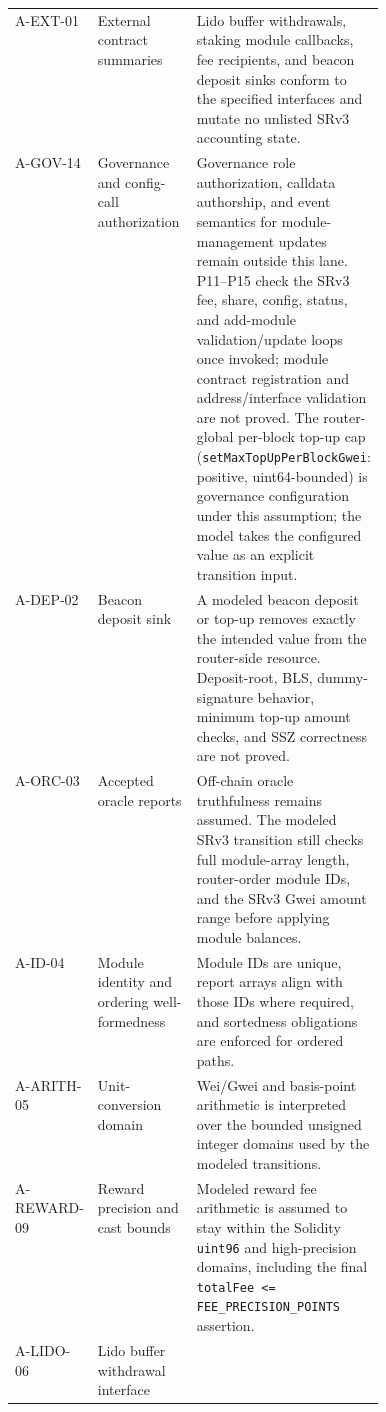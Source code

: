 \noindent
\begin{xltabular}{\linewidth}{@{}p{0.16\linewidth}p{0.27\linewidth}>{\raggedright\arraybackslash}X@{}}
  \toprule
   &  &  \\
  \midrule
  \endhead
  A-EXT-01 & External contract summaries &
  Lido buffer withdrawals, staking module callbacks, fee recipients, and beacon
  deposit sinks conform to the specified interfaces and mutate no unlisted SRv3
  accounting state. \\
  \rowsep
  A-GOV-14 & Governance and config-call authorization &
  Governance role authorization, calldata authorship, and event semantics for
  module-management updates remain outside this lane. P11--P15 check the SRv3
  fee, share, config, status, and add-module validation/update loops once invoked;
  module contract registration and address/interface validation are not proved.
  The router-global per-block top-up cap
  (\texttt{setMaxTopUpPerBlockGwei}: positive, uint64-bounded) is governance
  configuration under this assumption; the model takes the configured value as
  an explicit transition input. \\
  \rowsep
  A-DEP-02 & Beacon deposit sink &
  A modeled beacon deposit or top-up removes exactly the intended value from the
  router-side resource. Deposit-root, BLS, dummy-signature behavior, minimum
  top-up amount checks, and SSZ correctness are not proved. \\
  \rowsep
  A-ORC-03 & Accepted oracle reports &
  Off-chain oracle truthfulness remains assumed. The modeled SRv3 transition
  still checks full module-array length, router-order module IDs, and the SRv3
  Gwei amount range before applying module balances. \\
  \rowsep
  A-ID-04 & Module identity and ordering well-formedness &
  Module IDs are unique, report arrays align with those IDs where required, and
  sortedness obligations are enforced for ordered paths. \\
  \rowsep
  A-ARITH-05 & Unit-conversion domain &
  Wei/Gwei and basis-point arithmetic is interpreted over the bounded unsigned
  integer domains used by the modeled transitions. \\
  \rowsep
  A-REWARD-09 & Reward precision and cast bounds &
  Modeled reward fee arithmetic is assumed to stay within the Solidity
  \texttt{uint96} and high-precision domains, including the final
  \texttt{totalFee <= FEE\_PRECISION\_POINTS} assertion. \\
  \rowsep
  A-LIDO-06 & Lido buffer withdrawal interface &

\end{xltabular}

